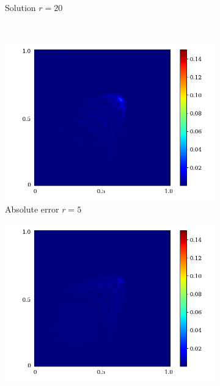 \begin{figure}[!htb]
\begin{center}
\begin{subfigure}[b]{0.23\textwidth}
\begin{center}
       \end{center}
            \caption{Solution $r = 20$}
        \end{subfigure}\\  
        \begin{subfigure}[b]{0.23\textwidth}
            \begin{center}
                \includegraphics[trim = {0, 0, 3cm, 0}, clip, width=\textwidth]{Pictures/X-rom-LE-SAE-5-abs-err.png}
            \end{center}
            \caption{Absolute error $r = 5$}
        \end{subfigure}  
        \begin{subfigure}[b]{0.23\textwidth}
            \begin{center}
                \includegraphics[trim = {0, 0, 3cm, 0}, clip, width=\textwidth]{Pictures/X-rom-LE-SAE-10-abs-err.png}

\end{center}
\end{subfigure}
\end{center}
\end{figure}
